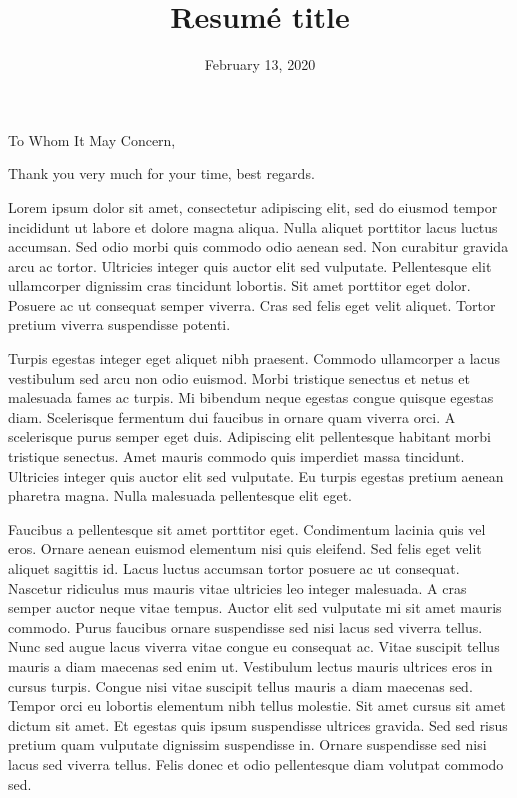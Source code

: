 \documentclass[11pt,a4paper,roman]{moderncv}        %
\title{Resumé title}                               %
\begin{document}
\recipient{\-}{ }
\date{February 13, 2020}
\opening{To Whom It May Concern,}
\closing{Thank you very much for your time, best regards.}
\makelettertitle

\justifying



Lorem ipsum dolor sit amet, consectetur adipiscing elit, sed do eiusmod tempor incididunt ut labore et dolore magna aliqua. Nulla aliquet porttitor lacus luctus accumsan. Sed odio morbi quis commodo odio aenean sed. Non curabitur gravida arcu ac tortor. Ultricies integer quis auctor elit sed vulputate. Pellentesque elit ullamcorper dignissim cras tincidunt lobortis. Sit amet porttitor eget dolor. Posuere ac ut consequat semper viverra. Cras sed felis eget velit aliquet. Tortor pretium viverra suspendisse potenti.

Turpis egestas integer eget aliquet nibh praesent. Commodo ullamcorper a lacus vestibulum sed arcu non odio euismod. Morbi tristique senectus et netus et malesuada fames ac turpis. Mi bibendum neque egestas congue quisque egestas diam. Scelerisque fermentum dui faucibus in ornare quam viverra orci. A scelerisque purus semper eget duis. Adipiscing elit pellentesque habitant morbi tristique senectus. Amet mauris commodo quis imperdiet massa tincidunt. Ultricies integer quis auctor elit sed vulputate. Eu turpis egestas pretium aenean pharetra magna. Nulla malesuada pellentesque elit eget.

Faucibus a pellentesque sit amet porttitor eget. Condimentum lacinia quis vel eros. Ornare aenean euismod elementum nisi quis eleifend. Sed felis eget velit aliquet sagittis id. Lacus luctus accumsan tortor posuere ac ut consequat. Nascetur ridiculus mus mauris vitae ultricies leo integer malesuada. A cras semper auctor neque vitae tempus. Auctor elit sed vulputate mi sit amet mauris commodo. Purus faucibus ornare suspendisse sed nisi lacus sed viverra tellus. Nunc sed augue lacus viverra vitae congue eu consequat ac. Vitae suscipit tellus mauris a diam maecenas sed enim ut. Vestibulum lectus mauris ultrices eros in cursus turpis. Congue nisi vitae suscipit tellus mauris a diam maecenas sed. Tempor orci eu lobortis elementum nibh tellus molestie. Sit amet cursus sit amet dictum sit amet. Et egestas quis ipsum suspendisse ultrices gravida. Sed sed risus pretium quam vulputate dignissim suspendisse in. Ornare suspendisse sed nisi lacus sed viverra tellus. Felis donec et odio pellentesque diam volutpat commodo sed.
\end{document}
